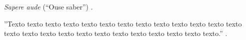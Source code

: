 


\vspace*{10cm}
\begin{citacao}
\textit{Sapere aude} (“Ouse saber”) \cite{kant1985}.
\end{citacao}

    \vspace*{5cm}
	
        ''Texto texto texto texto texto texto texto texto texto texto texto texto texto texto texto texto texto texto texto texto texto texto texto texto texto.'' \cite[p. 4]{manualufpe2020}.
	
\newpage